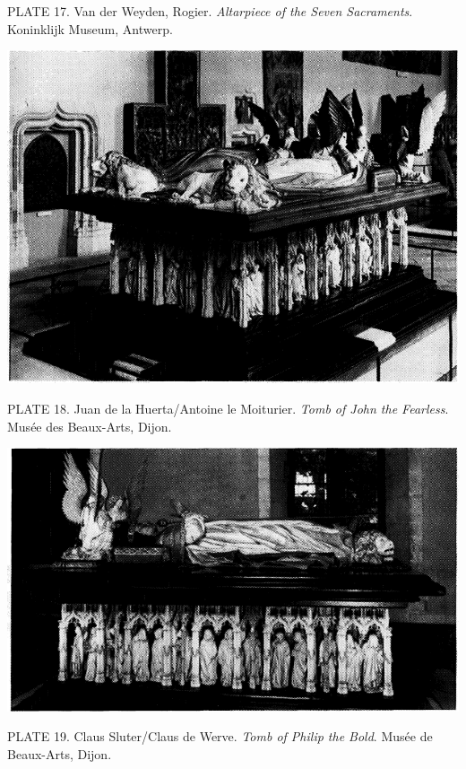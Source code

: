 PLATE 17. Van der Weyden, Rogier. \emph{Altarpiece of the Seven
Sacraments}. Koninklijk Museum, Antwerp.

\protect\hypertarget{20_ILLUSTRATIONS_FOLLOW_PAGE.xhtmlux5cux23id_18}{}{}\includegraphics{include/html/images/338_1.png}

PLATE 18. Juan de la Huerta/Antoine le Moiturier. \emph{Tomb of John the
Fearless}. Musée des Beaux-Arts, Dijon.

\includegraphics{include/html/images/338_2.png}

PLATE 19. Claus Sluter/Claus de Werve. \emph{Tomb of Philip the Bold}.
Musée de Beaux-Arts, Dijon.

